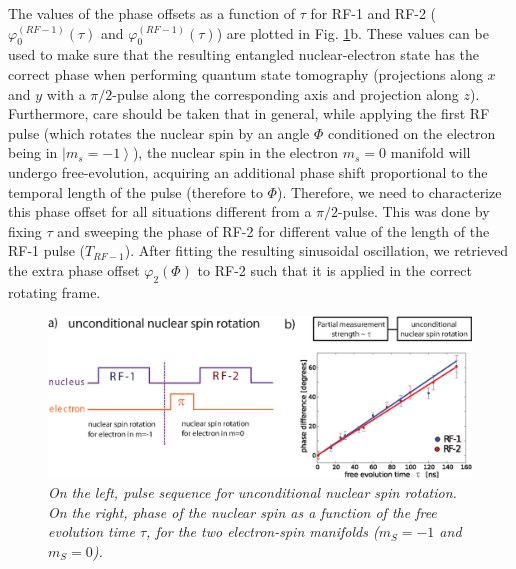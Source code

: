 The values of the phase offsets as a function of $\tau$ for RF-1 and RF-2 ($\varphi_0^{(RF-1)} (\tau)$ and $\varphi_0^{(RF-1)} (\tau)$) are plotted in Fig. \ref{fig:RF}b. These values can be used to make sure that the resulting entangled nuclear-electron state has the correct phase when performing quantum state tomography (projections along $x$ and $y$ with a $\pi/2$-pulse along the corresponding axis and projection along $z$).\\
Furthermore, care should be taken that in general, while applying the first RF pulse (which rotates the nuclear spin by an angle $\Phi$ conditioned on the electron being in $\left| m_s=-1 \right \rangle$), the nuclear spin in the electron $ m_s=0$ manifold will undergo free-evolution, acquiring an additional phase shift proportional to the temporal length of the pulse (therefore to $\Phi$). Therefore, we need to characterize this phase offset for all situations different from a $\pi/2$-pulse. This was done by fixing $\tau$ and sweeping the phase of RF-2 for different value of the length of the RF-1 pulse ($T_{RF-1}$). After fitting the resulting sinusoidal oscillation, we retrieved the extra phase offset $\varphi_2 (\Phi)$ to RF-2 such that it is applied in the correct rotating frame. 

\begin{figure} [h]
\includegraphics [width = 12 cm]{SOM/fig03_RFpulses_v2.eps}
\caption{\textit {On the left, pulse sequence for unconditional nuclear spin rotation. On the right, phase of the nuclear spin as a function of the free evolution time $\tau$, for the two electron-spin manifolds ($m_S=-1$ and $m_S=0$).}}
\label{fig:RF}
\end{figure} 



